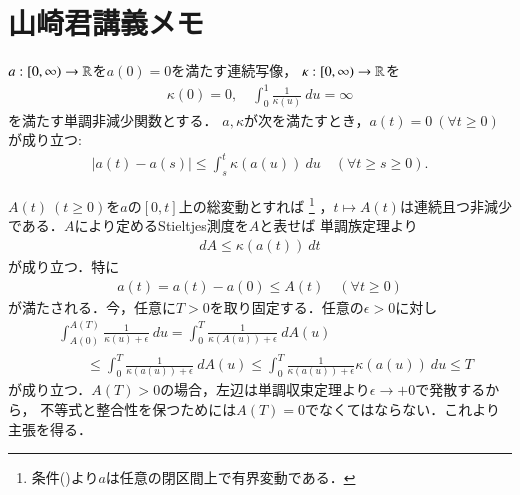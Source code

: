 \chapter{山崎君講義メモ}
	\begin{screen}
		\begin{thm}[Yamazaki]
			$a:[0,\infty) \rightarrow \mathbb{R}$を$a(0) = 0$を満たす連続写像，
			$\kappa:[0,\infty) \rightarrow \mathbb{R}$を
			\begin{align}
				\kappa(0) = 0,\quad 
				\int_0^1 \frac{1}{\kappa(u)}\ du = \infty
			\end{align}
			を満たす単調非減少関数とする．
			$a,\kappa$が次を満たすとき，$a(t) = 0\ (\forall t \geq 0)$が成り立つ:
			\begin{align}
				|a(t) - a(s)| \leq \int_s^t \kappa(a(u))\ du
				\quad (\forall t \geq s \geq 0).
				\label{eq:thm_yamazaki_1}
			\end{align}
		\end{thm}
	\end{screen}
	
	\begin{prf}
		$A(t)\ (t \geq 0)$を$a$の$[0,t]$上の総変動とすれば
		\footnote{
			条件()より$a$は任意の閉区間上で有界変動である．
		}
		，$t \longmapsto A(t)$は連続且つ非減少である．$A$により定めるStieltjes測度を$A$と表せば
		単調族定理より
		\begin{align}
			dA \leq \kappa(a(t))\ dt
		\end{align}
		が成り立つ．特に
		\begin{align}
			a(t) = a(t) - a(0) \leq A(t) \quad (\forall t \geq 0)
		\end{align}
		が満たされる．今，任意に$T > 0$を取り固定する．任意の$\epsilon > 0$に対し
		\begin{align}
			&\int_{A(0)}^{A(T)} \frac{1}{\kappa(u) + \epsilon}\ du
			= \int_0^T \frac{1}{\kappa(A(u)) + \epsilon}\ dA(u) \\
			&\qquad \leq \int_0^T \frac{1}{\kappa(a(u)) + \epsilon}\ dA(u)
			\leq \int_0^T \frac{1}{\kappa(a(u)) + \epsilon} \kappa(a(u))\ du
			\leq T
		\end{align}
		が成り立つ．$A(T) > 0$の場合，左辺は単調収束定理より$\epsilon \longrightarrow +0$で発散するから，
		不等式と整合性を保つためには$A(T) = 0$でなくてはならない．これより主張を得る．
		\QED
	\end{prf}